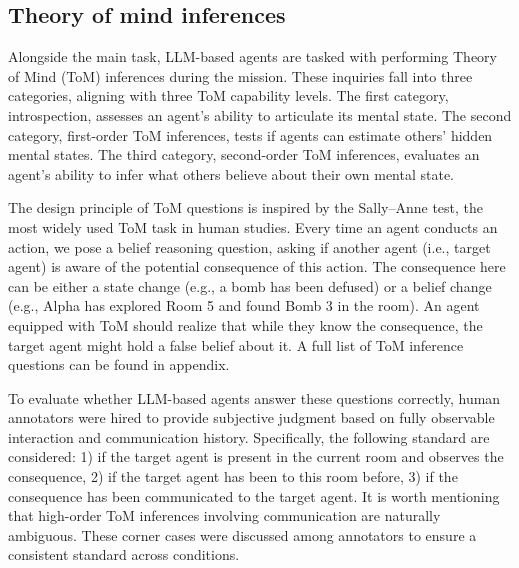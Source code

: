 \documentclass[11pt]{article}
\begin{document}
\subsection{Theory of mind inferences}

Alongside the main task, LLM-based agents are tasked with performing Theory of Mind (ToM) inferences during the mission. These inquiries fall into three categories, aligning with three ToM capability levels. The first category, introspection, assesses an agent's ability to articulate its mental state. The second category, first-order ToM inferences, tests if agents can estimate others' hidden mental states. The third category, second-order ToM inferences, evaluates an agent's ability to infer what others believe about their own mental state. 

The design principle of ToM questions is inspired by the Sally–Anne test, the most widely used ToM task in human studies. Every time an agent conducts an action, we pose a belief reasoning question, asking if another agent (i.e., target agent) is aware of the potential consequence of this action. The consequence here can be either a state change (e.g., a bomb has been defused) or a belief change (e.g., Alpha has explored Room 5 and found Bomb 3 in the room). An agent equipped with ToM should realize that while they know the consequence, the target agent might hold a false belief about it. A full list of ToM inference questions can be found in appendix.

To evaluate whether LLM-based agents answer these questions correctly, human annotators were hired to provide subjective judgment based on fully observable interaction and communication history. Specifically, the following standard are considered: 1) if the target agent is present in the current room and observes the consequence, 2) if the target agent has been to this room before, 3) if the consequence has been communicated to the target agent. It is worth mentioning that high-order ToM inferences involving communication are naturally ambiguous. These corner cases were discussed among annotators to ensure a consistent standard across conditions. 





\end{document}
